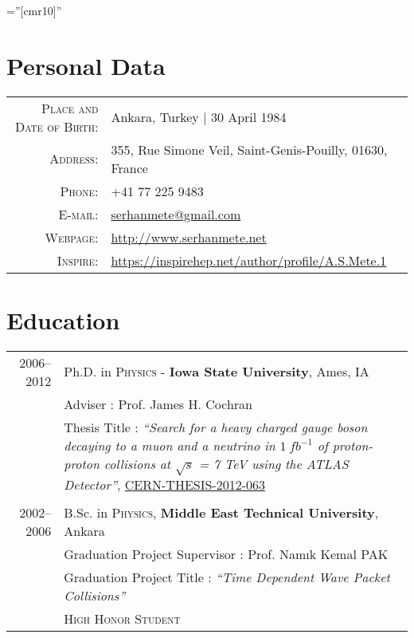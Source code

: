 \documentclass[a4paper,10pt]{article}
\begin{document}
\pagestyle{empty} %

\font\fb=''[cmr10]'' %

\par{\par}

\section{Personal Data}

\begin{tabular}{rl}
    \textsc{Place and Date of Birth:} 			& Ankara, Turkey  | 30 April 1984 							\\
    \textsc{Address:}   					& 355, Rue Simone Veil, Saint-Genis-Pouilly, 01630, France		\\
    \textsc{Phone:}     						& +41 77 225 9483										\\
    \textsc{E-mail:}     						& \href{mailto:serhanmete@gmail.com}{serhanmete@gmail.com}	\\
    \textsc{Webpage:}						& \href{http://www.serhanmete.net}{http://www.serhanmete.net} 	\\
    \textsc{Inspire:}						& \href{https://inspirehep.net/author/profile/A.S.Mete.1}{https://inspirehep.net/author/profile/A.S.Mete.1}
\end{tabular}

\vspace{-1mm}
\section{Education}

\begin{tabular}{r | p{15.5cm}}
\textsc{2006--2012}				&  Ph.D. in \textsc{Physics} - \textbf{Iowa State University}, Ames, IA \\ 
							& Adviser\phantom{Ttle} : Prof. James H. Cochran 				\\
							& Thesis Title : {\it``Search for a heavy charged gauge boson decaying to a 
							    muon and a neutrino in $1\ fb^{-1}$ of proton-proton collisions 
							    at $\sqrt{s}$ = 7 TeV using the ATLAS Detector''}, \href{http://cds.cern.ch/record/1454661}{CERN-THESIS-2012-063}  \\	
\multicolumn{2}{c}{} \\
\textsc{2002--2006} 				& B.Sc. in \textsc{Physics}, \textbf{Middle East Technical University}, Ankara				\\
							& Graduation Project Supervisor : Prof. Nam{\i}k Kemal \textsc{PAK}						\\
							& Graduation Project Title \phantom{rvsor} : \it{``Time Dependent Wave Packet Collisions''} 	\\
							& \normalsize \textsc{High Honor Student}											\\
\end{tabular}
\end{document}
